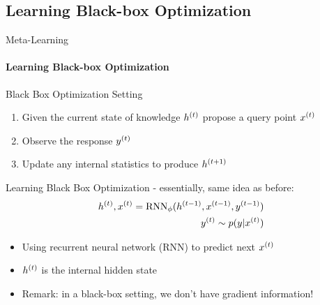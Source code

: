 \subsection{Learning Black-box Optimization}
\begin{frame}[c]{Meta-Learning}
\framesubtitle{Learning Black-box Optimization}

Black Box Optimization Setting
\begin{enumerate}
    \item Given the current state of knowledge $\iter[\bocount]{h}$ propose a query point $\iter[\bocount]{x}$
    \item Observe the response $\iter[\bocount]{y}$
    \item Update any internal statistics to produce $\iter[\bocount+1]{h}$
\end{enumerate}

\pause

Learning Black Box Optimization - essentially, same idea as before:
\begin{eqnarray}
\iter[\bocount]{h}, \iter[\bocount]{x} = \text{RNN}_\phi(\iter[\bocount-1]{h}, \iter[\bocount-1]{x}, \iter[\bocount-1]{y}) \nonumber \\
\iter[\bocount]{y} \sim p(y|\iter[\bocount]{x})\nonumber
\end{eqnarray}

\begin{itemize}
    \item Using recurrent neural network (RNN) to predict next $\iter[\bocount]{x}$
    \item $\iter[\bocount]{h}$ is the internal hidden state 
    \pause
    \item \alert{Remark:} in a black-box setting, we don't have gradient information!
\end{itemize}


\end{frame}
